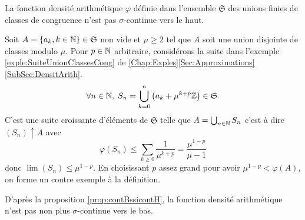 \begin{propn} \label{prop:DensitArithNonCont}
 La fonction densité arithmétique $\varphi$ définie dans l'ensemble $\mathfrak{S}$ des unions finies de classes de congruence n'est pas $\sigma$-continue vers le haut.
\end{propn}
\begin{demo}
 Soit $A = \left\lbrace a_k, k\in \mathbb{N}\right\rbrace \in \mathfrak{S}$ non vide et $\mu\geq 2$ tel que $A$ soit une union disjointe de classes modulo $\mu$. Pour $p\in \mathbb{N}$ arbitraire, considérons la suite dans l'exemple \ref{exple:SuiteUnionClassesCong} de \ref{Chap:Exples}\ref{Sec:Approximations}\ref{SubSec:DensitArith}.
\begin{displaymath}
 \forall n \in \mathbb{N}, \; S_n = \bigcup_{k =0}^n \left(a_k + \mu^{k+p} \mathbb{Z}\right) \in \mathfrak{S}.
\end{displaymath}
C'est une suite croissante d'éléments de $\mathfrak{S}$ telle que $A = \bigcup_{n\in \mathbb{N}}S_n$ c'est à dire $(S_n)\uparrow A$ avec
\begin{displaymath}
 \varphi(S_n) \leq \sum_{k\geq 0} \frac{1}{\mu^{k+p}} = \frac{\mu^{1-p}}{\mu - 1}
\end{displaymath}
donc $\lim (S_n)\leq \mu^{1-p}$. En choisissant $p$ assez grand pour avoir $\mu^{1-p} < \varphi(A)$, on forme un contre exemple à la définition.
\end{demo}
\begin{rem}
 D'après la proposition \ref{prop:contBssicontH}, la fonction densité arithmétique n'est pas non plus $\sigma$-continue vers le bas.
\end{rem}

